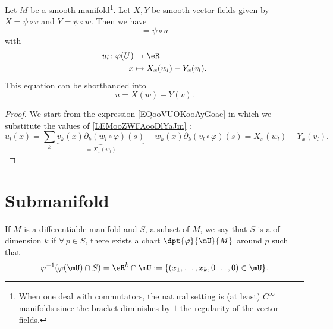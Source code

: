 \begin{lemma}
	Let \( M\) be a smooth manifold\footnote{When one deal with commutators, the natural setting is (at least) \(  C^{\infty}\) manifolds since the bracket diminishes by \( 1\) the regularity of the vector fields.}. Let \( X,Y\) be smooth vector fields given by \( X=\psi\circ v\) and \( Y=\psi\circ w\). Then we have
	\begin{equation}
		[\psi\circ v,\psi\circ w]=\psi\circ u
	\end{equation}
	with
	\begin{equation}
		\begin{aligned}
			u_l\colon \varphi(U) & \to \eR                    \\
			x                    & \mapsto X_x(w_l)-Y_x(v_l).
		\end{aligned}
	\end{equation}
	This equation can be shorthanded into
	\begin{equation}
		u=X(w)-Y(v).
	\end{equation}
\end{lemma}

\begin{proof}
	We start from the expression \ref{EQooVUOKooAyGoae} in which we substitute the values of \eqref{LEMooZWFAooDlYaJm} :
	\begin{equation}
		u_l(x)=\sum_k\underbrace{v_k(x)\partial_k(w_l\circ\varphi)(s)}_{=X_x(w_l)}-w_k(x)\partial_k(v_l\circ\varphi)(s)=X_x(w_l)-Y_x(v_l).
	\end{equation}
\end{proof}

\section{Submanifold}

\begin{definition}      \label{DEFooLQHWooMOTgzq}
	If $M$ is a differentiable manifold and $S$, a subset of $M$, we say that $S$ is a  of dimension $k$ if $\forall\,p\in S$, there exists a chart $\dpt{\varphi}{\mU}{M}$ around $p$ such that
	\begin{equation}        \label{EQooLWQRooQJCQbA}
		\varphi^{-1}(\varphi(\mU)\cap S)=\eR^k\cap\mU:=\{(x_1,\ldots,x_k,0\ldots,0)\in\mU\}.
	\end{equation}
\end{definition}

